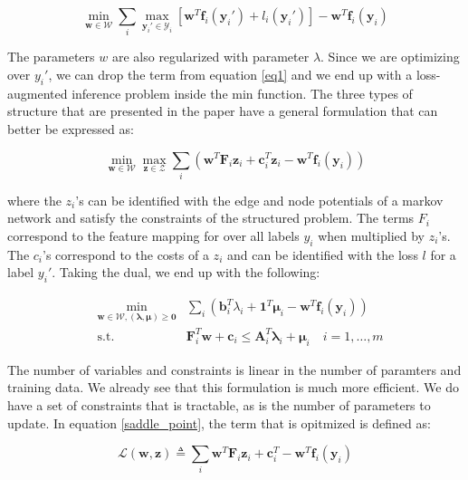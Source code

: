 \documentclass{article}
\renewcommand{\vec}{\mathbf}
\begin{document}
\begin{equation}
  \min_{\vec w \in \mathcal{W}} \sum_i \max_{\vec y_i' \in \mathcal{Y}_i} \left[ \vec w^T \vec f_i(\vec y_i') + l_i(\vec y_i') \right] - \vec w^T \vec f_i(\vec y_i)
\end{equation}

The parameters $w$ are also regularized with parameter $\lambda$. Since we are optimizing over $y_i'$, we can drop the term from equation \ref{eq1} and we end up with a loss-augmented inference problem inside the min function. The three types of structure that are presented in the paper have a general formulation that can better be expressed as:

\begin{equation}
  \min_{\vec w \in \mathcal{W}} \max_{\vec z \in \mathcal{Z}} \sum_i \left( \vec w^T \vec F_i \vec z_i + \vec c_i^T \vec z_i - \vec w^T \vec f_i(\vec y_i) \right)
  \label{saddle_point}
\end{equation}

where the $z_i$'s can be identified with the edge and node potentials of a markov network and satisfy the constraints of the structured problem. The terms $F_i$ correspond to the feature mapping for over all labels $y_i$ when multiplied by $z_i$'s. The $c_i$'s correspond to the costs of a $z_i$ and can be identified with the loss $l$ for a label $y_i'$. Taking the dual, we end up with the following:

\begin{equation}
  \begin{aligned}
    &\min_{\vec w \in \mathcal{W}, (\vec \lambda,\vec \mu) \geq \vec 0} &\sum_i \left( \vec b_i^T \lambda_i + \mathbf{1}^T \vec \mu_i - \vec w^T \vec f_i(\vec y_i) \right)\\
    &\text{s.t.} &\vec F_i^T \vec w + \vec c_i \leq \vec A_i^T \vec \lambda_i + \vec \mu_i \quad i=1,\dots,m
  \end{aligned}
\end{equation}

The number of variables and constraints is linear in the number of paramters and training data. We already see that this formulation is much more efficient. We do have a set of constraints that is tractable, as is the number of parameters to update. In equation \ref{saddle_point}, the term that is opitmized is defined as:

\begin{equation}
  \mathcal{L}(\vec w,\vec z) \triangleq \sum_i \vec w^T \vec F_i \vec z_i + \vec c_i^T - \vec w^T \vec f_i(\vec y_i)
  \label{saddle_obj}
\end{equation}
\end{document}
